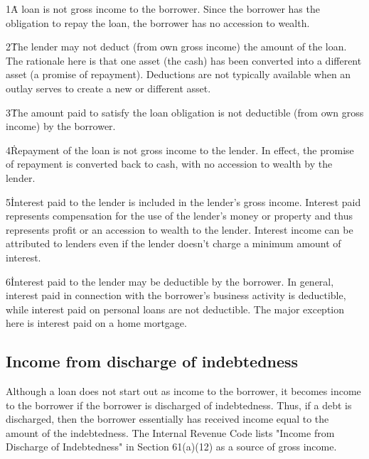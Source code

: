 1\. A loan is not gross income to the borrower. Since the borrower has the obligation to
repay the loan, the borrower has no accession to wealth.



2\. The lender may not deduct (from own gross income) the amount of the loan. The
rationale here is that one asset (the cash) has been converted into a different asset (a
promise of repayment). Deductions are not typically available when an outlay serves to
create a new or different asset.



3\. The amount paid to satisfy the loan obligation is not deductible (from own gross
income) by the borrower.



4\. Repayment of the loan is not gross income to the lender. In effect, the promise of
repayment is converted back to cash, with no accession to wealth by the lender.



5\. Interest paid to the lender is included in the lender's gross income. Interest paid
represents compensation for the use of the lender's money or property and thus represents
profit or an accession to wealth to the lender. Interest income can be attributed to
lenders even if the lender doesn't charge a minimum amount of interest.



6\. Interest paid to the lender may be deductible by the borrower. In general, interest
paid in connection with the borrower's business activity is deductible, while interest
paid on personal loans are not deductible. The major exception here is interest paid on a
home mortgage.




\subsection{Income from discharge of indebtedness}
\label{sss:inco-8565}




Although a loan does not start out as income to the borrower, it becomes income to the
borrower if the borrower is discharged of indebtedness. Thus, if a debt is discharged,
then the borrower essentially has received income equal to the amount of the indebtedness.
The Internal Revenue Code lists "Income from Discharge of Indebtedness" in Section
61(a)(12) as a source of gross income.



